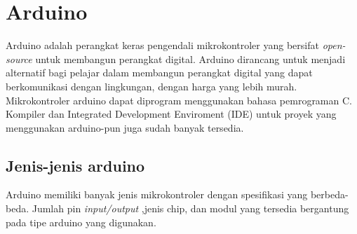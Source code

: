  
\section{Arduino} 
Arduino adalah perangkat keras pengendali mikrokontroler yang bersifat \textit{open-source} untuk membangun perangkat digital. Arduino dirancang untuk menjadi alternatif bagi pelajar dalam membangun perangkat digital yang dapat berkomunikasi dengan lingkungan, dengan harga yang lebih murah. Mikrokontroler arduino dapat diprogram menggunakan bahasa pemrograman C. Kompiler dan Integrated Development Enviroment (IDE) untuk proyek yang menggunakan arduino-pun juga sudah banyak tersedia. 

\subsection{Jenis-jenis arduino}
Arduino memiliki banyak jenis mikrokontroler dengan spesifikasi yang berbeda-beda. Jumlah pin \textit{input/output} ,jenis chip, dan modul yang tersedia bergantung pada tipe arduino yang digunakan.


